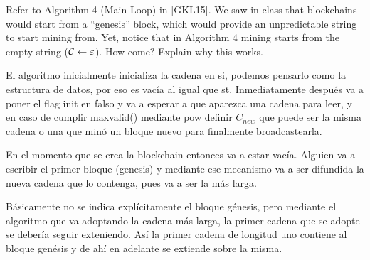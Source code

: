 \documentclass[12pt,addpoints,answers]{exam}
\begin{document}
\begin{questions}

\newpage

\question[10] Refer to Algorithm 4 (Main Loop) in [GKL15]. We saw in class that blockchains would start from a ``genesis'' block, which would provide an unpredictable string to start mining from. Yet, notice that in Algorithm 4 mining starts from the empty string (${\cal C} \leftarrow \varepsilon$). How come? Explain why this works.

\begin{solution} %
    El algoritmo inicialmente inicializa la cadena en si, podemos pensarlo como la estructura de datos, por eso es vacía al igual que st. 
    Inmediatamente después va a poner el flag init en falso y va a esperar a que aparezca una cadena para leer, y en caso de cumplir maxvalid() 
    mediante pow definir $C_{new}$ que puede ser la misma cadena o una que minó un bloque nuevo para finalmente broadcastearla.

    En el momento que se crea la blockchain entonces va a estar vacía. Alguien va a escribir el primer bloque (genesis) y mediante ese mecanismo
    va a ser difundida la nueva cadena que lo contenga, pues va a ser la más larga.

    Básicamente no se indica explícitamente el bloque génesis, pero mediante el algoritmo que va adoptando la cadena más larga, la 
    primer cadena que se adopte se debería seguir exteniendo. Así la primer cadena de longitud uno contiene al bloque genésis y de ahí
    en adelante se extiende sobre la misma.


\end{solution}
\end{questions}
\end{document}

